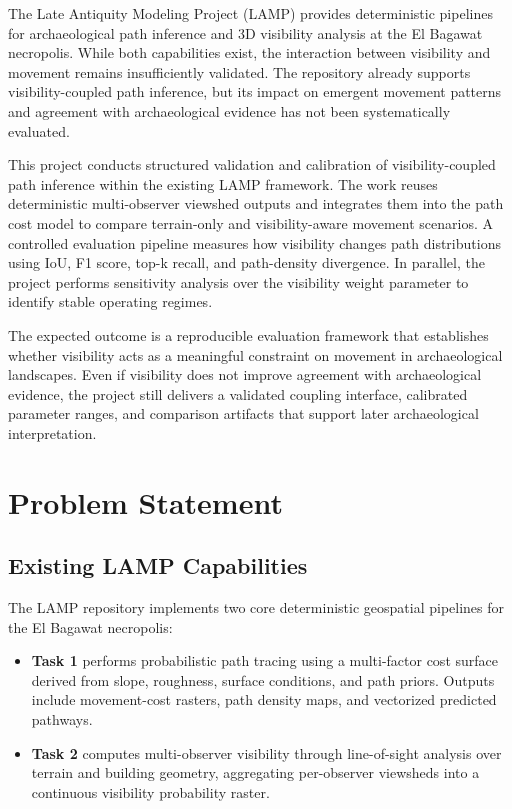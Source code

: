 \documentclass[11pt]{article}
\let\oldsection\section
\renewcommand{\section}{\clearpage\oldsection}
\begin{document}
The Late Antiquity Modeling Project (LAMP) provides deterministic pipelines for archaeological path inference and 3D visibility analysis at the El Bagawat necropolis. While both capabilities exist, the interaction between visibility and movement remains insufficiently validated. The repository already supports visibility-coupled path inference, but its impact on emergent movement patterns and agreement with archaeological evidence has not been systematically evaluated.

This project conducts structured validation and calibration of visibility-coupled path inference within the existing LAMP framework. The work reuses deterministic multi-observer viewshed outputs and integrates them into the path cost model to compare terrain-only and visibility-aware movement scenarios. A controlled evaluation pipeline measures how visibility changes path distributions using IoU, F1 score, top-k recall, and path-density divergence. In parallel, the project performs sensitivity analysis over the visibility weight parameter to identify stable operating regimes.

The expected outcome is a reproducible evaluation framework that establishes whether visibility acts as a meaningful constraint on movement in archaeological landscapes. Even if visibility does not improve agreement with archaeological evidence, the project still delivers a validated coupling interface, calibrated parameter ranges, and comparison artifacts that support later archaeological interpretation.

\section{Problem Statement}

\subsection{Existing LAMP Capabilities}

The LAMP repository implements two core deterministic geospatial pipelines for the El Bagawat necropolis:

\begin{itemize}
  \item \textbf{Task 1} performs probabilistic path tracing using a multi-factor cost surface derived from slope, roughness, surface conditions, and path priors. Outputs include movement-cost rasters, path density maps, and vectorized predicted pathways.
  \item \textbf{Task 2} computes multi-observer visibility through line-of-sight analysis over terrain and building geometry, aggregating per-observer viewsheds into a continuous visibility probability raster.
\end{itemize}
\end{document}
